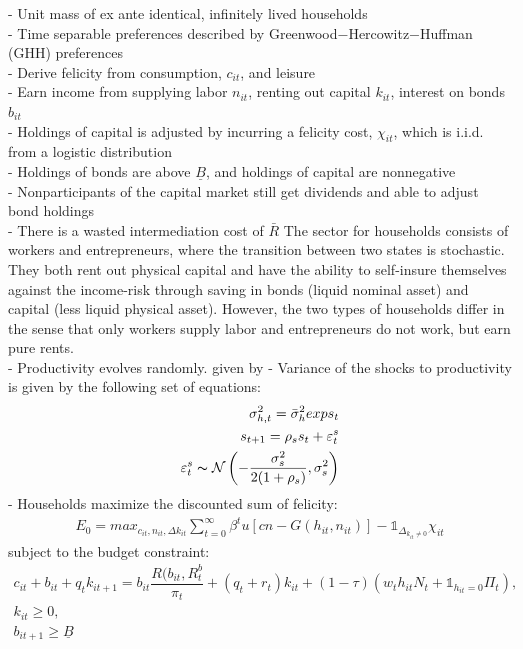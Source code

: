\documentclass[titlepage]{\econtex}
\begin{document}
- Unit mass of ex ante identical, infinitely lived households\\
- Time separable preferences described by Greenwood$-$Hercowitz$-$Huffman (GHH) preferences\\
- Derive felicity from consumption, $c_{it}$, and leisure\\
- Earn income from supplying labor $n_{it}$, renting out capital $k_{it}$, interest on bonds $b_{it}$\\
- Holdings of capital is adjusted by incurring a felicity cost, $\chi_{it}$, which is i.i.d. from a logistic distribution\\
- Holdings of bonds are above $ \underline{B} $, and holdings of capital are nonnegative\\
- Nonparticipants of the capital market still get dividends and able to adjust bond holdings\\
- There is a wasted intermediation cost of $\bar{R}$
The sector for households consists of workers and entrepreneurs, where the transition between two states is stochastic. They both rent out physical capital and have the ability to self-insure themselves against the income-risk through saving in bonds (liquid nominal asset) and capital (less liquid physical asset). However, the two types of households differ in the sense that only workers supply labor and entrepreneurs do not work, but earn pure rents.\\
- Productivity evolves randomly. given by
-  Variance of the shocks to productivity is given by the following set of equations:\\
\begin{align}
    \sigma_{h,t}^{2}={\bar{\sigma}}_{h}^{2}exps_{t}\\  
    s_{t+1} =\rho_{s}s_{t} + \varepsilon_{t}^{s}\\    
    \varepsilon_{t}^{s} \thicksim \mathcal{N}\left(-\dfrac{\sigma_{s}^{2}}{2(1+\rho_{s})},\sigma_{s}^{2}\right)
\end{align}
- Households maximize the discounted sum of felicity:\\
\begin{align}
   E_{0} = max _{{c_{it},n_{it},\Delta k_{it}}} \sum_{t=0}^{\infty} \beta^{t} u[cn-G(h_{it},n_{it})]-\mathbb{1}_{\Delta_{k_{it}\neq0}} \chi_{it} 
\end{align}
subject to the budget constraint:\\
\begin{align}
c_{it}+b_{it}+q_{t}k_{it+1} =b_{it}\dfrac{R(b_{it},R_{t}^{b}}{\pi_t} +(q_{t}+r_{t})k_{it}+(1-\tau)(w_{t}h_{it}N_{t} + \mathbb{1}_{h_{it}=0} \Pi_{t}),\\
k_{it}\geq 0,\\
b_{it+1}\geq \underline{B}
\end{align}
\end{document}
